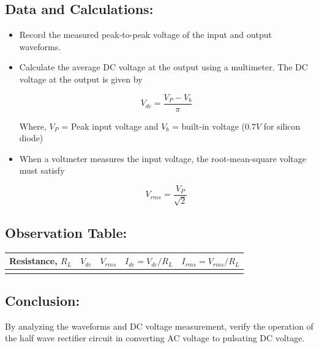 \subsection*{Data and Calculations:}
\begin{itemize}
    \item Record the measured peak-to-peak voltage of the input and output waveforms.
    \item Calculate the average DC voltage at the output using a multimeter. The DC voltage at the output is given by

    $$  V_{dc} = \frac{V_P - V_b}{\pi} $$

    Where, $V_P$ = Peak input voltage and $V_b$ = built-in voltage ($0.7V$ for silicon diode)

    \item When a voltmeter measures the input voltage, the root-mean-square voltage must satisfy

    $$V_{rms} = \frac{V_P}{\sqrt{2}}$$
\end{itemize}

\subsection*{Observation Table:}

\begin{table}[h]
    \centering
    \begin{tabular}{c|m{1.5 cm}|m{1.5 cm}|m{2.75 cm}|c}
        \hline
        Resistance, $R_L$ & $V_{dc}$ & $V_{rms}$ & $I_{dc} = V_{dc} / R_L$ & $I_{rms} = V_{rms} / R_L$ \\ \hline
         &   &   &   &    \\ \hline
    \end{tabular}
    \label{tab:rectify}
\end{table}

\subsection*{Conclusion:}
By analyzing the waveforms and DC voltage measurement, verify the operation of the half wave rectifier circuit in converting AC voltage to pulsating DC voltage.

\newpage